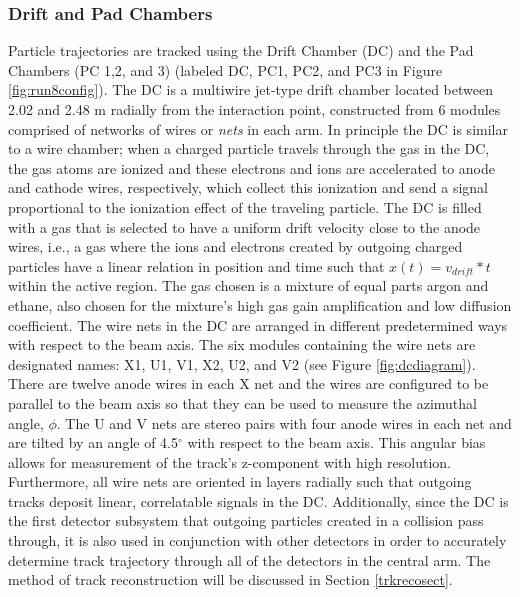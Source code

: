 \subsubsection{Drift and Pad Chambers}
\label{sect:dcpc}
Particle trajectories are tracked using the Drift Chamber (DC) and the Pad Chambers (PC 1,2, and 3) \citep{DCfocus} (labeled DC, PC1, PC2, and PC3 in Figure \ref{fig:run8config}). The DC is a multiwire jet-type drift chamber located between 2.02 and 2.48 m radially from the interaction point, constructed from 6 modules comprised of networks of wires or \textit{nets} in each arm. In principle the DC is similar to a wire chamber; when a charged particle travels through the gas in the DC, the gas atoms are ionized and these electrons and ions are accelerated to anode and cathode wires, respectively, which collect this ionization and send a signal proportional to the ionization effect of the traveling particle. The DC is filled with a gas that is selected to have a uniform drift velocity close to the anode wires, i.e., a gas where the ions and electrons created by outgoing charged particles have a linear relation in position and time such that $x(t) = v_{drift} * t$ within the active region. The gas chosen is a mixture of equal parts argon and ethane, also chosen for the mixture's high gas gain amplification and low diffusion coefficient. The wire nets in the DC are arranged in different predetermined ways with respect to the beam axis. The six modules containing the wire nets are designated names: X1, U1, V1, X2, U2, and V2 (see Figure \ref{fig:dcdiagram}). There are twelve anode wires in each X net and the wires are configured to be parallel to the beam axis so that they can be used to measure the azimuthal angle, $\phi$. The U and V nets are stereo pairs with four anode wires in each net and are tilted by an angle of 4.5$^\circ$ with respect to the beam axis. This angular bias allows for measurement of the track's z-component with high resolution. Furthermore, all wire nets are oriented in layers radially such that outgoing tracks deposit linear, correlatable signals in the DC. Additionally, since the DC is the first detector subsystem that outgoing particles created in a collision pass through, it is also used in conjunction with other detectors in order to accurately determine track trajectory through all of the detectors in the central arm. The method of track reconstruction will be discussed in Section \ref{trkrecosect}.


